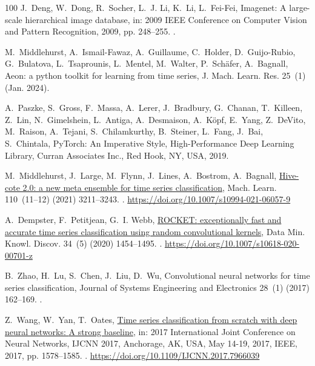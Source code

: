 \documentclass[final,3p,times,twocolumn]{elsarticle}
\begin{document}
\begin{thebibliography}{100}
J.~Deng, W.~Dong, R.~Socher, L.~J. Li, K.~Li, L.~Fei-Fei, Imagenet: A
  large-scale hierarchical image database, in: 2009 IEEE Conference on Computer
  Vision and Pattern Recognition, 2009, pp. 248--255.
\newblock \href {https://doi.org/10.1109/CVPR.2009.5206848}
  {}.

M.~Middlehurst, A.~Ismail-Fawaz, A.~Guillaume, C.~Holder, D.~Guijo-Rubio,
  G.~Bulatova, L.~Tsaprounis, L.~Mentel, M.~Walter, P.~Sch\"{a}fer, A.~Bagnall,
  Aeon: a python toolkit for learning from time series, J. Mach. Learn. Res.
  25~(1) (Jan. 2024).

A.~Paszke, S.~Gross, F.~Massa, A.~Lerer, J.~Bradbury, G.~Chanan, T.~Killeen,
  Z.~Lin, N.~Gimelshein, L.~Antiga, A.~Desmaison, A.~K\"{o}pf, E.~Yang,
  Z.~DeVito, M.~Raison, A.~Tejani, S.~Chilamkurthy, B.~Steiner, L.~Fang,
  J.~Bai, S.~Chintala, PyTorch: An Imperative Style, High-Performance Deep
  Learning Library, Curran Associates Inc., Red Hook, NY, USA, 2019.

M.~Middlehurst, J.~Large, M.~Flynn, J.~Lines, A.~Bostrom, A.~Bagnall,
  \href{https://doi.org/10.1007/s10994-021-06057-9}{Hive-cote 2.0: a new meta
  ensemble for time series classification}, Mach. Learn. 110~(11–12) (2021)
  3211–3243.
\newblock \href {https://doi.org/10.1007/s10994-021-06057-9}
  {}.
\newline\urlprefix\url{https://doi.org/10.1007/s10994-021-06057-9}

A.~Dempster, F.~Petitjean, G.~I. Webb,
  \href{https://doi.org/10.1007/s10618-020-00701-z}{{ROCKET:} exceptionally
  fast and accurate time series classification using random convolutional
  kernels}, Data Min. Knowl. Discov. 34~(5) (2020) 1454--1495.
\newblock \href {https://doi.org/10.1007/S10618-020-00701-Z}
  {}.
\newline\urlprefix\url{https://doi.org/10.1007/s10618-020-00701-z}

B.~Zhao, H.~Lu, S.~Chen, J.~Liu, D.~Wu, Convolutional neural networks for time
  series classification, Journal of Systems Engineering and Electronics 28~(1)
  (2017) 162--169.
\newblock \href {https://doi.org/10.21629/JSEE.2017.01.18}
  {}.

Z.~Wang, W.~Yan, T.~Oates,
  \href{https://doi.org/10.1109/IJCNN.2017.7966039}{Time series classification
  from scratch with deep neural networks: {A} strong baseline}, in: 2017
  International Joint Conference on Neural Networks, {IJCNN} 2017, Anchorage,
  AK, USA, May 14-19, 2017, {IEEE}, 2017, pp. 1578--1585.
\newblock \href {https://doi.org/10.1109/IJCNN.2017.7966039}
  {}.
\newline\urlprefix\url{https://doi.org/10.1109/IJCNN.2017.7966039}


\end{thebibliography}
\end{document}
